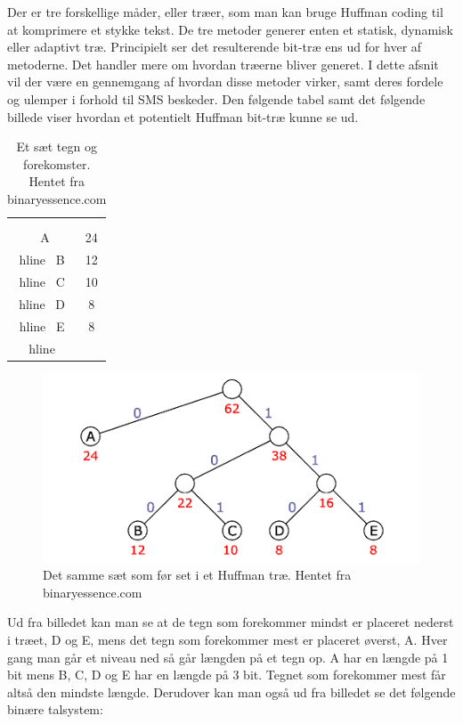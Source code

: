Der er tre forskellige måder, eller træer, som man kan bruge Huffman coding til at komprimere et stykke tekst. De tre metoder generer enten et statisk, dynamisk eller adaptivt træ. Principielt ser det resulterende bit-træ ens ud for hver af metoderne. Det handler mere om hvordan træerne bliver generet. I dette afsnit vil der være en gennemgang af hvordan disse metoder virker, samt deres fordele og ulemper i forhold til SMS beskeder. Den følgende tabel samt det følgende billede viser hvordan et potentielt Huffman bit-træ kunne se ud.

\begin{table}[H]
\begin{center}
\begin{tabular}{|c|c|}
    \hline
    \cellcolor{ForestGreen}\color{white}{\textbf{Tegn}}\\[2ex] &  \cellcolor{ForestGreen}\color{white}{\textbf{Forekomster}}\\[2ex] \hline
    \ A & 24 \\hline
    \ B & 12 \\hline
    \ C & 10 \\hline
    \ D & 8 \\hline
    \ E & 8 \\hline
\end{tabular} 
\caption{Et sæt tegn og forekomster. Hentet fra binaryessence.com}
\end{center}
\end{table}

\begin{figure}[H]
\centering
\includegraphics[width=\linewidth]{Billeder/huffman_tree.png}
\caption{Det samme sæt som før set i et Huffman træ. Hentet fra binaryessence.com}
\label{fig:huffmantree}
\end{figure}

Ud fra billedet kan man se at de tegn som forekommer mindst er placeret nederst i træet, D og E, mens det tegn som forekommer mest er placeret øverst, A. Hver gang man går et niveau ned så går længden på et tegn op. A har en længde på 1 bit mens B, C, D og E har en længde på 3 bit. Tegnet som forekommer mest får altså den mindste længde. Derudover kan man også ud fra billedet se det følgende binære talsystem:

